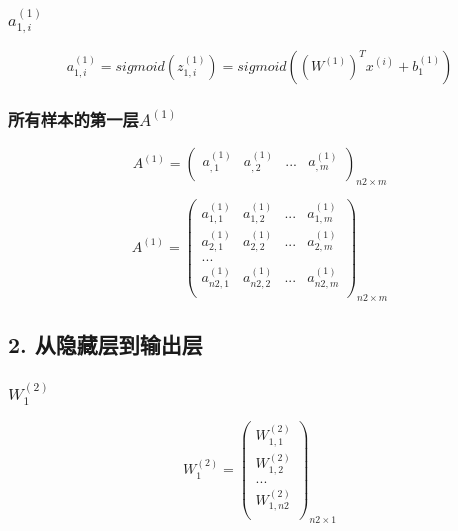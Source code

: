 \documentclass[
]{article}
\begin{document}
\hypertarget{header-n24}{%
\subsubsection{\texorpdfstring{\(a^{(1)}_{1,i}\)}{a\^{}\{(1)\}\_\{1,i\}}}\label{header-n24}}

\[a^{(1)}_{1,i} = sigmoid(z^{(1)}_{1,i}) = sigmoid((W^{(1)})^{T}x^{(i)}+ b^{(1)}_{1})\]

\hypertarget{header-n26}{%
\subsubsection{\texorpdfstring{所有样本的第一层\(A^{(1)}\)}{所有样本的第一层A\^{}\{(1)\}}}\label{header-n26}}

\[A^{(1)} = {\begin{pmatrix}
    a^{(1)}_{,1} &  a^{(1)}_{,2} & ... & a^{(1)}_{,m} \\
  \end{pmatrix}}_{n2×m}\]

\[A^{(1)}={\begin{pmatrix}
    a^{(1)}_{1,1} & a^{(1)}_{1,2} & ... & a^{(1)}_{1,m} \\
    a^{(1)}_{2,1} & a^{(1)}_{2,2} & ... & a^{(1)}_{2,m} \\
    ...\\
    a^{(1)}_{n2,1} & a^{(1)}_{n2,2} & ... & a^{(1)}_{n2,m} \\
  \end{pmatrix}}_{n2×m}\]

\hypertarget{header-n29}{%
\subsection{2. 从隐藏层到输出层}\label{header-n29}}

\hypertarget{header-n30}{%
\subsubsection{\texorpdfstring{\(W^{(2)}_{1}\)}{W\^{}\{(2)\}\_\{1\}}}\label{header-n30}}

\[W^{(2)}_{1} = {
    \begin{pmatrix}
     W^{(2)}_{1,1} \\
     W^{(2)}_{1,2} \\
     ...\\
     W^{(2)}_{1,n2} \\
    \end{pmatrix}
  }_{n2×1}\]
\end{document}
